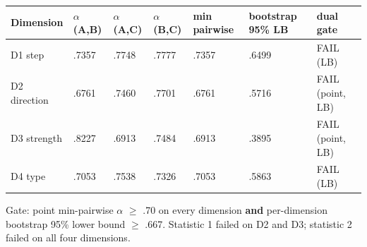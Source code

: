 \begin{longtable}[]{@{}
  >{\raggedright\arraybackslash}p{}
  >{\raggedright\arraybackslash}p{}
  >{\raggedright\arraybackslash}p{}
  >{\raggedright\arraybackslash}p{}
  >{\raggedright\arraybackslash}p{}
  >{\raggedright\arraybackslash}p{}
  >{\raggedright\arraybackslash}p{}@{}}
\toprule\noalign{}
\begin{minipage}[b]{\linewidth}\raggedright
Dimension
\end{minipage} & \begin{minipage}[b]{\linewidth}\raggedright
$\alpha$(A,B)
\end{minipage} & \begin{minipage}[b]{\linewidth}\raggedright
$\alpha$(A,C)
\end{minipage} & \begin{minipage}[b]{\linewidth}\raggedright
$\alpha$(B,C)
\end{minipage} & \begin{minipage}[b]{\linewidth}\raggedright
min pairwise
\end{minipage} & \begin{minipage}[b]{\linewidth}\raggedright
bootstrap 95\% LB
\end{minipage} & \begin{minipage}[b]{\linewidth}\raggedright
dual gate
\end{minipage} \\
\midrule\noalign{}
\endhead
\bottomrule\noalign{}
\endlastfoot
D1 step & .7357 & .7748 & .7777 & .7357 & .6499 & FAIL (LB) \\
D2 direction & .6761 & .7460 & .7701 & .6761 & .5716 & FAIL (point, LB) \\
D3 strength & .8227 & .6913 & .7484 & .6913 & .3895 & FAIL (point, LB) \\
D4 type & .7053 & .7538 & .7326 & .7053 & .5863 & FAIL (LB) \\
\end{longtable}

Gate: point min-pairwise $\alpha$ $\ge$ .70 on every dimension \textbf{and} per-dimension bootstrap 95\% lower bound $\ge$ .667. Statistic 1 failed on D2 and D3; statistic 2 failed on all four dimensions.

